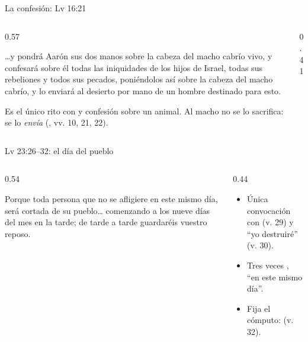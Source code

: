\begin{frame}{La confesión: Lv 16:21}
\begin{columns}[c,onlytextwidth]
\begin{column}{0.57\textwidth}
\begin{cita}\ldots{}y pondrá Aarón sus dos manos sobre la cabeza del macho cabrío vivo, y confesará sobre él todas las iniquidades de los hijos de Israel, todas sus rebeliones y todos sus pecados, poniéndolos así sobre la cabeza del macho cabrío, y lo enviará al desierto por mano de un hombre destinado para esto.\end{cita}
\scriptsize Es el único rito con  y confesión sobre un animal. Al macho no se lo sacrifica: se lo \emph{envía} (, vv. 10, 21, 22).
\end{column}
\begin{column}{0.41\textwidth}\end{column}
\end{columns}
\end{frame}

\begin{frame}{Lv 23:26--32: el día del pueblo}
\begin{columns}[t,onlytextwidth]
\begin{column}{0.54\textwidth}
\begin{cita}Porque toda persona que no se afligiere en este mismo día, será cortada de su pueblo\ldots{} comenzando a los nueve días del mes en la tarde; de tarde a tarde guardaréis vuestro reposo.\end{cita}
\end{column}
\begin{column}{0.44\textwidth}\small
\begin{itemize}
\item Única convocación con  (v. 29) y ``yo destruiré'' (v. 30).
\item Tres veces , ``en este mismo día''.
\item Fija el cómputo:  (v. 32).
\end{itemize}
\end{column}
\end{columns}
\end{frame}

